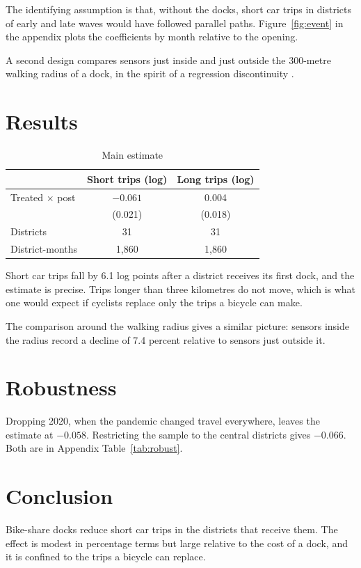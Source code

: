 The identifying assumption is that, without the docks, short car trips in districts of early and late waves would have followed parallel paths. Figure~\ref{fig:event} in the appendix plots the coefficients by month relative to the opening.

A second design compares sensors just inside and just outside the 300-metre walking radius of a dock, in the spirit of a regression discontinuity \citep{imbens2008regression}.

\section{Results}\label{sec:results}
\begin{table}[h]
  \centering
  \caption{Main estimate}\label{tab:main}
  \begin{tabular}{lcc}
    \toprule
    & Short trips (log) & Long trips (log) \\
    \midrule
    Treated $\times$ post & $-0.061$ & 0.004 \\
                          & (0.021) & (0.018) \\
    \midrule
    Districts & 31 & 31 \\
    District-months & 1,860 & 1,860 \\
    \bottomrule
  \end{tabular}
\end{table}

Short car trips fall by 6.1 log points after a district receives its first dock, and the estimate is precise. Trips longer than three kilometres do not move, which is what one would expect if cyclists replace only the trips a bicycle can make.

The comparison around the walking radius gives a similar picture: sensors inside the radius record a decline of 7.4 percent relative to sensors just outside it.

\section{Robustness}\label{sec:robust}
Dropping 2020, when the pandemic changed travel everywhere, leaves the estimate at $-0.058$. Restricting the sample to the central districts gives $-0.066$. Both are in Appendix Table~\ref{tab:robust}.

\section{Conclusion}\label{sec:conclusion}
Bike-share docks reduce short car trips in the districts that receive them. The effect is modest in percentage terms but large relative to the cost of a dock, and it is confined to the trips a bicycle can replace.
